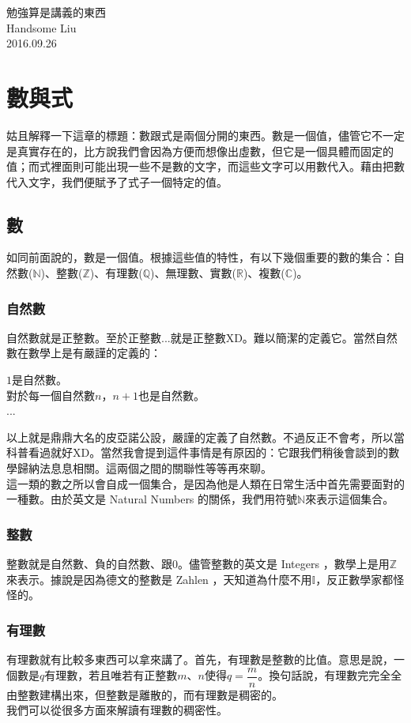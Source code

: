 \documentclass[12pt]{extreport}
\begin{document}
\begin{center}
	\Huge{勉強算是講義的東西}\\ 
	\huge{Handsome Liu}\\ 
	\huge{2016.09.26}\\ 
\end{center}
\chapter{數與式}
    姑且解釋一下這章的標題：數跟式是兩個分開的東西。數是一個值，儘管它不一定是真實存在的，比方說我們會因為方便而想像出虛數，但它是一個具體而固定的值；而式裡面則可能出現一些不是數的文字，而這些文字可以用數代入。藉由把數代入文字，我們便賦予了式子一個特定的值。\\
    \section{數}
        如同前面說的，數是一個值。根據這些值的特性，有以下幾個重要的數的集合：自然數(\(\mathbb{N}\))、整數(\(\mathbb{Z}\))、有理數(\(\mathbb{Q}\))、無理數、實數(\(\mathbb{R}\))、複數(\(\mathbb{C}\))。\\
        \subsection{自然數}
            自然數就是正整數。至於正整數...就是正整數XD。難以簡潔的定義它。當然自然數在數學上是有嚴謹的定義的：\\
            \begin{mdframed}
            \(1\)是自然數。\\
            對於每一個自然數\(n\)，\(n+1\)也是自然數。\\
            ...\\
            \end{mdframed}
            以上就是鼎鼎大名的皮亞諾公設，嚴謹的定義了自然數。不過反正不會考，所以當科普看過就好XD。當然我會提到這件事情是有原因的：它跟我們稍後會談到的數學歸納法息息相關。這兩個之間的關聯性等等再來聊。\\
            這一類的數之所以會自成一個集合，是因為他是人類在日常生活中首先需要面對的一種數。由於英文是 Natural Numbers 的關係，我們用符號\(\mathbb{N}\)來表示這個集合。\\
        \subsection{整數}
            整數就是自然數、負的自然數、跟\(0\)。儘管整數的英文是 Integers ，數學上是用\(\mathbb{Z}\)來表示。據說是因為德文的整數是 Zahlen ，天知道為什麼不用\(\mathbb{I}\)，反正數學家都怪怪的。\\
        \subsection{有理數}
            有理數就有比較多東西可以拿來講了。首先，有理數是整數的比值。意思是說，一個數是\(q\)有理數，若且唯若有正整數\(m\)、\(n\)使得\(q=\dfrac{m}{n}\)。換句話說，有理數完完全全由整數建構出來，但整數是離散的，而有理數是稠密的。\\
            我們可以從很多方面來解讀有理數的稠密性。
\end{document}
